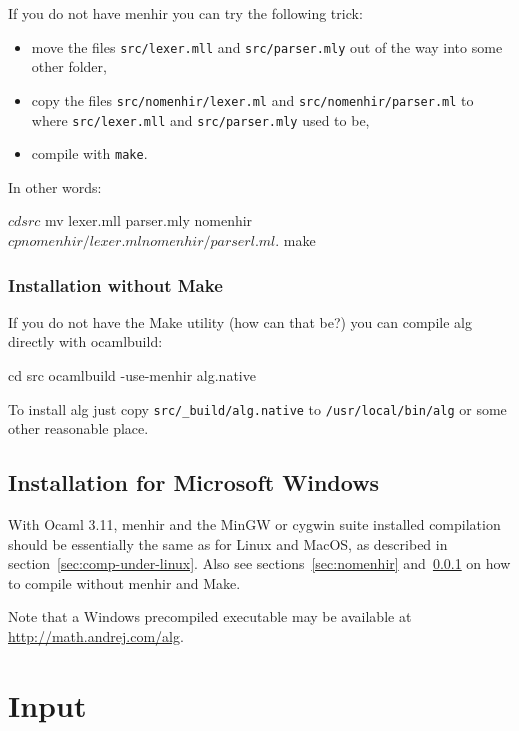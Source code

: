 \documentclass{article}
\begin{document}
If you do not have menhir you can try the following trick:
%
\begin{itemize}
\item move the files \texttt{src/lexer.mll} and \texttt{src/parser.mly} out of
  the way into some other folder,
\item copy the files \texttt{src/nomenhir/lexer.ml} and
  \texttt{src/nomenhir/parser.ml} to where \texttt{src/lexer.mll} and
  \texttt{src/parser.mly} used to be,
\item compile with \texttt{make}.
\end{itemize}
%
In other words:
%
\begin{shell}
$ cd src
$ mv lexer.mll parser.mly nomenhir
$ cp nomenhir/lexer.ml nomenhir/parserl.ml .
$ make
\end{shell}

\subsubsection{Installation without Make}
\label{sec:nomake}

If you do not have the Make utility (how can that be?) you can compile
alg directly with ocamlbuild:
%
\begin{shell}
cd src
ocamlbuild -use-menhir alg.native
\end{shell}
%
To install alg just copy \texttt{src/\_build/alg.native} to
\texttt{/usr/local/bin/alg} or some other reasonable place.

\subsection{Installation for Microsoft Windows}
\label{sec:comp-inst-micr}

With Ocaml 3.11, menhir and the MinGW or cygwin suite installed
compilation should be essentially the same as for Linux and MacOS, as
described in section~\ref{sec:comp-under-linux}. Also see
sections~\ref{sec:nomenhir} and~\ref{sec:nomake} on how to compile
without menhir and Make.

Note that a Windows precompiled executable may be available at
\url{http://math.andrej.com/alg}.

\section{Input}
\label{sec:input}
\end{document}
